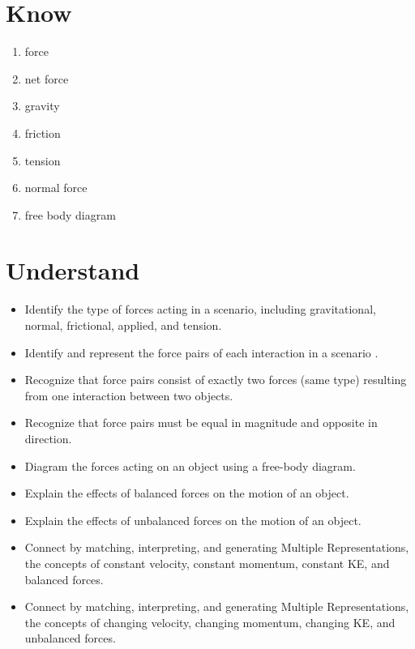 \documentclass[answers]{exam}
\begin{document}
\section*{Know}

\begin{multicols}{3}
\begin{enumerate}[itemsep=0pt]
    \item force
    \item net force
    \item gravity
    \item friction
    \item tension
    \item normal force
    \item free body diagram
\end{enumerate}
\end{multicols}

\section*{Understand}

\begin{itemize}[itemsep=0pt]
    \item Identify the type of forces acting in a scenario, including gravitational, normal, frictional, applied, 
    and tension.
    \item Identify and represent the force pairs of each interaction in a scenario .
    \item Recognize that force pairs consist of exactly two forces (same type) resulting from one interaction between two objects.
    \item Recognize that force pairs must be equal in magnitude and opposite in direction.
    \item Diagram the forces acting on an object using a free-body diagram.
    \item Explain the effects of balanced forces on the motion of an object.
    \item Explain the effects of unbalanced forces on the motion of an object.
    \item Connect by matching, interpreting, and generating Multiple Representations, the concepts of constant velocity, constant momentum, constant KE, and balanced forces.
    \item Connect by matching, interpreting, and generating Multiple Representations, the concepts of changing velocity, changing momentum, changing KE, and unbalanced forces.
\end{itemize}
\end{document}
